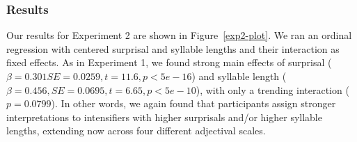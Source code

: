 \documentclass[10pt,letterpaper]{article}
\begin{document}

\subsubsection{Results}

Our results for Experiment 2 are shown in Figure~\ref{exp2-plot}. We ran an ordinal
regression with centered surprisal and syllable lengths and their interaction as fixed effects.
As in Experiment 1, we found strong main effects of surprisal ($\beta=0.301 SE=0.0259, t=11.6, p<5e-16$) and syllable length ($\beta=0.456, SE=0.0695, t=6.65, p<5e-10$), with only a trending interaction ($p=0.0799$).
In other words, we again found that participants assign stronger interpretations to intensifiers with higher surprisals and/or higher syllable lengths, extending now across four different adjectival scales.
\end{document}
